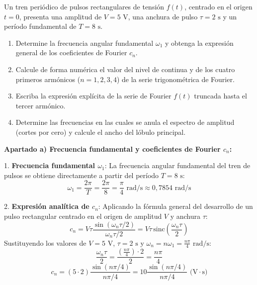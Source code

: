 \begin{problema}
Un tren periódico de pulsos rectangulares de tensión $f(t)$, centrado en el origen $t=0$, presenta una amplitud de $V = 5\text{ V}$, una anchura de pulso $\tau = 2\text{ s}$ y un período fundamental de $T = 8\text{ s}$.

\begin{enumerate}[label=\alph*)]
    \item Determine la frecuencia angular fundamental $\omega_1$ y obtenga la expresión general de los coeficientes de Fourier $c_n$.
    \item Calcule de forma numérica el valor del nivel de continua y de los cuatro primeros armónicos ($n = 1, 2, 3, 4$) de la serie trigonométrica de Fourier.
    \item Escriba la expresión explícita de la serie de Fourier $f(t)$ truncada hasta el tercer armónico.
    \item Determine las frecuencias en las cuales se anula el espectro de amplitud (cortes por cero) y calcule el ancho del lóbulo principal.
\end{enumerate}

\tcblower

\textbf{Apartado a) Frecuencia fundamental y coeficientes de Fourier $c_n$:}

1. \textbf{Frecuencia fundamental $\omega_1$}:
   La frecuencia angular fundamental del tren de pulsos se obtiene directamente a partir del período $T = 8\text{ s}$:
   \[
   \omega_1 = \frac{2\pi}{T} = \frac{2\pi}{8} = \frac{\pi}{4}\text{ rad/s} \approx 0{,}7854\text{ rad/s}
   \]

2. \textbf{Expresión analítica de $c_n$}:
   Aplicando la fórmula general del desarrollo de un pulso rectangular centrado en el origen de amplitud $V$ y anchura $\tau$:
   \[
   c_n = V \tau \frac{\sin(\omega_n \tau / 2)}{\omega_n \tau / 2} = V \tau \, \text{sinc}\left(\frac{\omega_n \tau}{2}\right)
   \]
   Sustituyendo los valores de $V = 5\text{ V}$, $\tau = 2\text{ s}$ y $\omega_n = n \omega_1 = \frac{n\pi}{4}\text{ rad/s}$:
   \[
   \frac{\omega_n \tau}{2} = \frac{\left(\frac{n\pi}{4}\right) \cdot 2}{2} = \frac{n\pi}{4}
   \]
   \[
   c_n = (5 \cdot 2) \frac{\sin(n\pi / 4)}{n\pi / 4} = 10 \frac{\sin(n\pi / 4)}{n\pi / 4}\text{ (V}\cdot\text{s)}
   \]

\vspace{0.3cm}


\end{problema}
